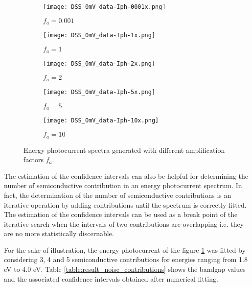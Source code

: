 \renewcommand{\coef}{0.45}
\begin{figure*}[h]
	\centering
	\begin{subfigure}{\coef\textwidth}
		\centering
	 	\texttt{[image: DSS\_0mV\_data-Iph-0001x.png]}
	 	\caption{$f_a=0.001$}
	 	\label{fig:fa0001}
	\end{subfigure}
	\begin{subfigure}{\coef\textwidth}
		\centering
	 	\texttt{[image: DSS\_0mV\_data-Iph-1x.png]}
	 	\caption{$f_a=1$}
	 	\label{fig:fa1}
	\end{subfigure}
	\begin{subfigure}{\coef\textwidth}
		\centering
	 	\texttt{[image: DSS\_0mV\_data-Iph-2x.png]}
	 	\caption{$f_a=2$}
	 	\label{fig:fa2}
	\end{subfigure}
	
	\begin{subfigure}{\coef\textwidth}
		\centering
	 	\texttt{[image: DSS\_0mV\_data-Iph-5x.png]}
	 	\caption{$f_a=5$}
	 	\label{fig:fa5}
	\end{subfigure}\quad
	\begin{subfigure}{\coef\textwidth}
		\centering
	 	\texttt{[image: DSS\_0mV\_data-Iph-10x.png]}
	 	\caption{$f_a=10$}
	 	\label{fig:fa10}
	\end{subfigure}
	\caption{Energy photocurrent spectra generated with different amplification factors $f_a$.}
	\label{fig:data_noise}
\end{figure*}

The estimation of the confidence intervals can also be helpful for determining 
the number of semiconductive contribution in an energy photocurrent spectrum. 
In fact, the determination of the number of semiconductive contributions is an 
iterative operation by adding contributions until the spectrum is correctly fitted. 
The estimation of the confidence intervals can be used as a break point of the 
iterative search when the intervals of two contributions are overlapping i.e. 
they are no more statistically discernable. 

For the sake of illustration, the energy photocurrent of the figure \ref{fig:fa0001} 
was fitted by considering 3, 4 and 5 semiconductive contributions for energies 
ranging from 1.8 eV to 4.0 eV. Table \ref{table:result_noise_contributions} 
shows the bandgap values and the associated confidence intervals obtained 
after numerical fitting. 


